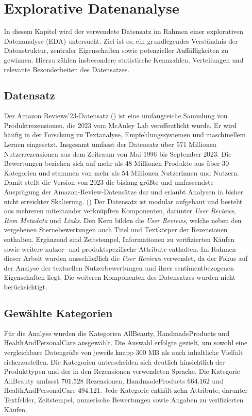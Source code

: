 \chapter{Explorative Datenanalyse}
In diesem Kapitel wird der verwendete Datensatz im Rahmen einer explorativen
Datenanalyse (EDA) untersucht. Ziel ist es, ein grundlegendes Verständnis der
Datenstruktur, zentraler Eigenschaften sowie potenzieller Auffälligkeiten zu
gewinnen. Hierzu zählen insbesondere statistische Kennzahlen, Verteilungen und
relevante Besonderheiten des Datensatzes.

\section{Datensatz}
Der Amazon Reviews’23-Datensatz (\cite{hou2024bridging}) ist eine umfangreiche Sammlung von
Produktrezensionen, die 2023 vom McAuley Lab veröffentlicht wurde. Er wird häufig
in der Forschung zu Textanalyse, Empfehlungssystemen und maschinellem Lernen
eingesetzt.
Insgesamt umfasst der Datensatz über 571 Millionen Nutzerrezensionen aus dem
Zeitraum von Mai 1996 bis September 2023. Die Bewertungen beziehen sich auf mehr
als 48 Millionen Produkte aus über 30 Kategorien und stammen von mehr als 54
Millionen Nutzerinnen und Nutzern. Damit stellt die Version von 2023 die bislang
größte und umfassendste Ausprägung der Amazon-Review-Datensätze dar und erlaubt
Analysen in bisher nicht erreichter Skalierung. (\cite{amazon2023})
Der Datensatz ist modular aufgebaut und besteht aus mehreren miteinander
verknüpften Komponenten, darunter \textit{User Reviews}, \textit{Item Metadata}
und \textit{Links}. Den Kern bilden die \textit{User Reviews}, welche neben den
vergebenen Sternebewertungen auch Titel und Textkörper der Rezensionen
enthalten. Ergänzend sind Zeitstempel, Informationen zu verifizierten Käufen
sowie weitere nutzer- und produktspezifische Attribute enthalten.
Im Rahmen dieser Arbeit wurden ausschließlich die \textit{User Reviews}
verwendet, da der Fokus auf der Analyse der textuellen Nutzerbewertungen und
ihrer sentimentbezogenen Eigenschaften liegt. Die weiteren Komponenten des
Datensatzes wurden nicht berücksichtigt.

\section{Gewählte Kategorien}
Für die Analyse wurden die Kategorien AllBeauty, HandmadeProducts und
HealthAndPersonalCare ausgewählt. Die Auswahl erfolgte gezielt, um sowohl eine
vergleichbare Datengröße von jeweils knapp 300 MB als auch inhaltliche Vielfalt
sicherzustellen. Die Kategorien unterscheiden sich deutlich hinsichtlich der
Produkttypen und der in den Rezensionen verwendeten Sprache. Die Kategorie
AllBeauty umfasst $701.528$ Rezensionen, HandmadeProducts $664.162$ und
HealthAndPersonalCare $494.121$. Jede Kategorie enthält zehn Attribute, darunter
Textfelder, Zeitstempel, numerische Bewertungen sowie Angaben zu verifizierten
Käufen.

